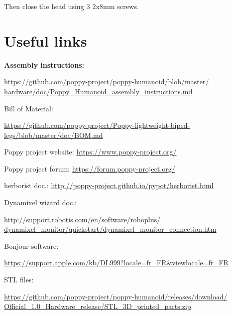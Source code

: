 \documentclass{article}
\begin{document}
Then close the head using 3 \diameter 2x8mm screws. %
 

 
\section{Useful links}
\label{documentation-links}

\textbf{Assembly instructions:}

\begin{flushright}
\href{https://github.com/poppy-project/poppy-humanoid/blob/master/hardware/doc/Poppy_Humanoid_assembly_instructions.md}{https://github.com/poppy-project/poppy-humanoid/blob/master/ hardware/doc/Poppy\_Humanoid\_assembly\_instructions.md}
\end{flushright}

Bill of Material:

\begin{flushright}
\href{https://github.com/poppy-project/Poppy-lightweight-biped-legs/blob/master/doc/BOM.md}{https://github.com/poppy-project/Poppy-lightweight-biped-legs/blob/master/doc/BOM.md}
\end{flushright}

Poppy project website: \hfill \url{https://www.poppy-project.org/} 

Poppy project forum: \hfill \url{https://forum.poppy-project.org/} 

herborist doc.: \hfill
\href{http://poppy-project.github.io/pypot/herborist.html}{http://poppy-project.github.io/pypot/herborist.html}

Dynamixel wizard doc.:

\begin{flushright}
\href{http://support.robotis.com/en/software/roboplus/dynamixel_monitor/quickstart/dynamixel_monitor_connection.htm}{http://support.robotis.com/en/software/roboplus/ dynamixel\_monitor/quickstart/dynamixel\_monitor\_connection.htm}
\end{flushright}

Bonjour software:

\begin{flushright}
\href{https://support.apple.com/kb/DL999?locale=fr_FR&viewlocale=fr_FR}{https://support.apple.com/kb/DL999?locale=fr\_FR\&viewlocale=fr\_FR}
\end{flushright}

STL files:

\begin{flushright}
\href{https://github.com/poppy-project/poppy-humanoid/releases/download/Official_1.0_Hardware_release/STL_3D_printed_parts.zip}{https://github.com/poppy-project/poppy-humanoid/releases/download/ Official\_1.0\_Hardware\_release/STL\_3D\_printed\_parts.zip}
\end{flushright}
\end{document}
